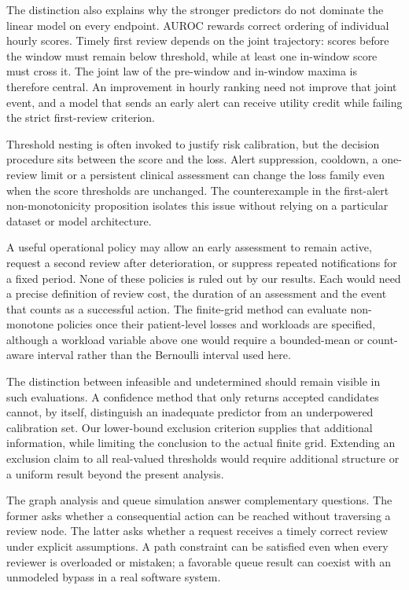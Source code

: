 The distinction also explains why the stronger predictors do not dominate the linear model on every endpoint. AUROC rewards correct ordering of individual hourly scores. Timely first review depends on the joint trajectory: scores before the window must remain below threshold, while at least one in-window score must cross it. The joint law of the pre-window and in-window maxima is therefore central. An improvement in hourly ranking need not improve that joint event, and a model that sends an early alert can receive utility credit while failing the strict first-review criterion.

Threshold nesting is often invoked to justify risk calibration, but the decision procedure sits between the score and the loss. Alert suppression, cooldown, a one-review limit or a persistent clinical assessment can change the loss family even when the score thresholds are unchanged. The counterexample in the first-alert non-monotonicity proposition isolates this issue without relying on a particular dataset or model architecture.

A useful operational policy may allow an early assessment to remain active, request a second review after deterioration, or suppress repeated notifications for a fixed period. None of these policies is ruled out by our results. Each would need a precise definition of review cost, the duration of an assessment and the event that counts as a successful action. The finite-grid method can evaluate non-monotone policies once their patient-level losses and workloads are specified, although a workload variable above one would require a bounded-mean or count-aware interval rather than the Bernoulli interval used here.

The distinction between infeasible and undetermined should remain visible in such evaluations. A confidence method that only returns accepted candidates cannot, by itself, distinguish an inadequate predictor from an underpowered calibration set. Our lower-bound exclusion criterion supplies that additional information, while limiting the conclusion to the actual finite grid. Extending an exclusion claim to all real-valued thresholds would require additional structure or a uniform result beyond the present analysis.

The graph analysis and queue simulation answer complementary questions. The former asks whether a consequential action can be reached without traversing a review node. The latter asks whether a request receives a timely correct review under explicit assumptions. A path constraint can be satisfied even when every reviewer is overloaded or mistaken; a favorable queue result can coexist with an unmodeled bypass in a real software system.


